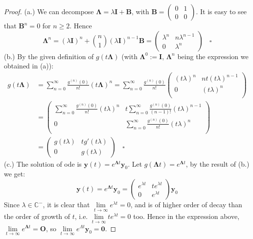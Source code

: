 \documentclass[a4paper, 10pt]{article}
\theoremstyle{definition}
\theoremstyle{hSol}
\begin{document}
\begin{proof} (a.) We can decompose $\bm{\Lambda} = \lambda \bm{I} + \bm{B}$, with $\bm{B}=\begin{pmatrix}
  0 & 1\\
  0 & 0
\end{pmatrix}$. It is easy to see that $\bm{B}^n =0$ for $n\geq 2$. Hence
$$
\bm{\Lambda}^n = (\lambda\bm{I})^n + \binom{n}{1} (\lambda \bm{I})^{n-1} \bm{B} = \begin{pmatrix}
  \lambda^n & n \lambda^{n-1} \\
  0 & \lambda^n
\end{pmatrix}~~~~\square
$$ 
(b.) By the given definition of $g(t\bm{\Lambda})$ (with $\bm{\Lambda}^0 :=\bm{I}$, $\bm{\Lambda}^n$ being the expression we obtained in (a)):
\begin{equation}
  \begin{split}
    g(t\bm{\Lambda}) &= \sum_{n=0}^{\infty} \frac{g^{(n)}(0)}{n!} (t \bm{\Lambda})^n= \sum_{n=0}^{\infty} \frac{g^{(n)}(0)}{n!} 
    \begin{pmatrix}
  (t\lambda)^n & n t(t\lambda)^{n-1} \\
  0 & (t\lambda)^n \\
  \end{pmatrix} \\
  &= \begin{pmatrix}
  \sum_{n=0}^{\infty} \frac{g^{(n)}(0)}{n!}(t\lambda)^n & t\sum_{n=0}^{\infty} \frac{g^{(n)}(0)}{(n-1)!}(t\lambda)^{n-1} \\
  0 & \sum_{n=0}^{\infty} \frac{g^{(n)}(0)}{n!}(t\lambda)^n \\
  \end{pmatrix} \\
  &= \begin{pmatrix}
    g(t \lambda) & t g'(t \lambda) \\
    0 & g(t \lambda)
  \end{pmatrix}~~~~\square
  \end{split}
\end{equation}
(c.) The solution of ode is $\bm{y}(t) = e^{\bm{\Lambda}t} \bm{y}_0$. Let $g(\bm{\Lambda}t) = e^{\bm{\Lambda}t}$, by the result of (b.) we get:
\begin{equation}
  \bm{y}(t) = e^{\bm{\Lambda}t}\bm{y}_0 = \begin{pmatrix}
    e^{\lambda t} & t e^{\lambda t} \\
    0 & e^{\lambda t}
  \end{pmatrix}\bm{y}_0
\end{equation}
Since $\lambda \in \mathbb{C}^-$, it is clear that $\lim\limits_{t\rightarrow\infty}e^{\lambda t}=0$, and is of higher order of decay than the order of growth of $t$, i.e. $\lim\limits_{t\rightarrow\infty} t e^{\lambda t}=0$ too. Hence in the expression above, $\lim\limits_{t\rightarrow\infty}e^{\bm{\Lambda}t} = \bm{O}$, so $\lim\limits_{t\rightarrow\infty} e^{\Lambda t} \bm{y}_0 = \bm{0}$. 


\end{proof}
\end{document}
